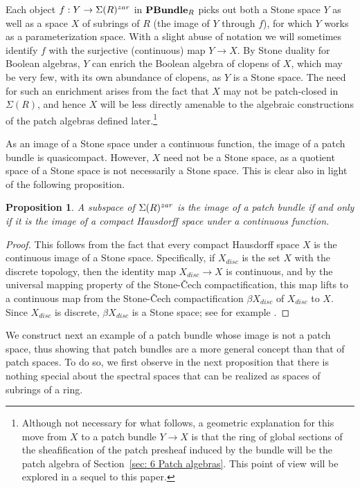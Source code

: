 \documentclass[11pt]{amsart}
\newtheorem{proposition}[theorem]{Proposition}
\theoremstyle{definition}
\begin{document}
Each object $f: Y\rightarrow \Sigma(R)^{\rm zar}$ in ${\bf PBundle}_R$ picks out both a Stone space $Y$ as well as a space $X$ of subrings of $R$ (the image of $Y$ through $f$), for which $Y$ works as a parameterization space. With a slight abuse of notation we will sometimes identify $f$ with the surjective (continuous) map $Y \rightarrow X$. By Stone duality for Boolean algebras, $Y$ can enrich the Boolean algebra of clopens of $X$, which may be very few, with its own abundance of clopens, as $Y$ is a Stone space.  The need for such an enrichment arises from the fact that $X$ may not be patch-closed in ${\Sigma}(R)$, and hence $X$ will be less directly amenable to  the algebraic constructions of the patch algebras defined later.\footnote{Although not necessary for what follows, a geometric explanation for this move from $X$ to a patch bundle $Y \rightarrow X$ is that the ring of global sections of the sheafification of the patch presheaf induced by the bundle will be the patch algebra of Section~\ref{sec: 6 Patch algebras}. This point of view will be explored in a sequel to this paper.} 

As an image of a Stone space under a continuous function, the image of a patch bundle is quasicompact. However, $X$ need not be a Stone space, as a quotient space of a Stone space is not necessarily a Stone space. This is clear also in light of the following proposition. 


\begin{proposition} \label{prop: KHaus} 
A subspace of $\Sigma(R)^{\rm zar}$ is the image of a patch bundle if and only if it is the image of a compact Hausdorff space under a continuous function. 
\end{proposition}

\begin{proof} 
This follows from the  fact that every compact Hausdorff space $X$ is the continuous image of a Stone space.  Specifically, if $X_{disc}$ is the set $X$ with the discrete topology, then the identity map $X_{disc} \rightarrow X$ is continuous, and by the universal mapping property of the Stone-\v{C}ech compactification, this map lifts to a continuous map from the Stone-\v{C}ech compactification $\beta X_{disc}$ of $X_{disc}$ to $X$. Since $X_{disc}$ is discrete, $\beta X_{disc}$ is  a Stone space; see for example  \cite[\href{https://stacks.math.columbia.edu/tag/090C}{Tag 090C}]{stacks-project}. 
\end{proof} 


We construct next an example of a patch bundle whose image is not a patch space, thus showing that patch bundles are a more general concept than that of patch spaces. To do so, we first observe in the next proposition that there is nothing special about the spectral spaces that can be realized as spaces of subrings of a ring.
\end{document}
